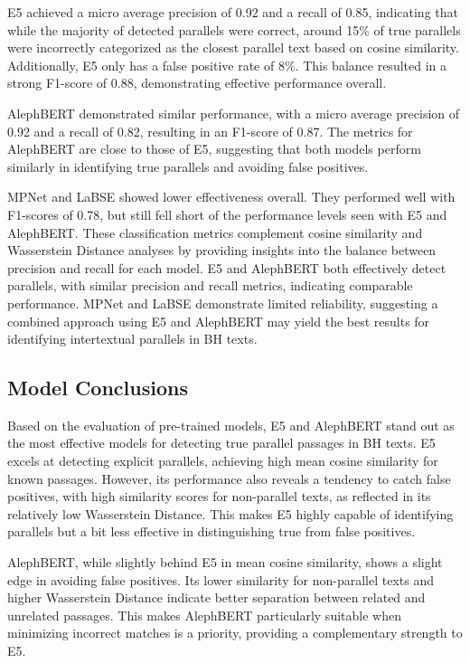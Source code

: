 \documentclass[12pt]{article}
\begin{document}
E5 achieved a micro average precision of 0.92 and a recall of 0.85, indicating that while the majority of detected parallels were correct, around 15\% of true parallels were incorrectly categorized as the closest parallel text based on cosine similarity. Additionally, E5 only has a false positive rate of 8\%. This balance resulted in a strong F1-score of 0.88, demonstrating effective performance overall.

AlephBERT demonstrated similar performance, with a micro average precision of 0.92 and a recall of 0.82, resulting in an F1-score of 0.87. The metrics for AlephBERT are close to those of E5, suggesting that both models perform similarly in identifying true parallels and avoiding false positives.

MPNet and LaBSE showed lower effectiveness overall. They performed well with F1-scores of 0.78, but still fell short of the performance levels seen with E5 and AlephBERT.
These classification metrics complement cosine similarity and Wasserstein Distance analyses by providing insights into the balance between precision and recall for each model. E5 and AlephBERT both effectively detect parallels, with similar precision and recall metrics, indicating comparable performance. MPNet and LaBSE demonstrate limited reliability, suggesting a combined approach using E5 and AlephBERT may yield the best results for identifying intertextual parallels in BH texts.

\subsection{Model Conclusions}
Based on the evaluation of pre-trained models, E5 and AlephBERT stand out as the most effective models for detecting true parallel passages in BH texts. E5 excels at detecting explicit parallels, achieving high mean cosine similarity for known passages. However, its performance also reveals a tendency to catch false positives, with high similarity scores for non-parallel texts, as reflected in its relatively low Wasserstein Distance. This makes E5 highly capable of identifying parallels but a bit less effective in distinguishing true from false positives.

AlephBERT, while slightly behind E5 in mean cosine similarity, shows a slight edge in avoiding false positives. Its lower similarity for non-parallel texts and higher Wasserstein Distance indicate better separation between related and unrelated passages. This makes AlephBERT particularly suitable when minimizing incorrect matches is a priority, providing a complementary strength to E5.
\end{document}
